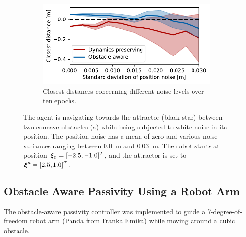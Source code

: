 \begin{figure}[htbp]
\begin{subfigure}{\columnwidth}
	\else
    \includegraphics[width=\textwidth]{figures/comparison_position_noise}
	\fi
    \caption{Closest distances concerning different noise levels over ten epochs.}
    \label{fig:comparison_position_noise}
    \end{subfigure}
	\caption{
 The agent is navigating towards the attractor (black star) between two concave obstacles (a) while being subjected to white noise in its position. The position noise has a mean of zero and various noise variances ranging between \qty{0.0}{m} and \qty{0.03}{m}. The robot starts at position $\boldsymbol{\xi}_0 = [-2.5, -1.0]^T$, and the attractor is set to $\boldsymbol{\xi}^a = [2.5, 1.0]^T$.
 }
\label{fig:position_noise}
\end{figure}
\fi

\subsection{Obstacle Aware Passivity Using a Robot Arm}
The obstacle-aware passivity controller was implemented to guide a 7-degree-of-freedom robot arm (Panda from Franka Emika) while moving around a cubic obstacle. 

